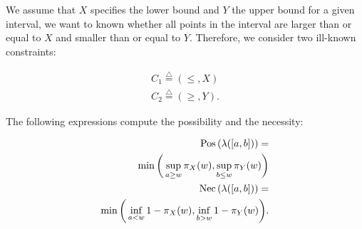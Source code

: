 We assume that $X$ specifies the lower bound and $Y$ the upper bound for a given interval, we want to known whether all points in the interval are larger than or equal to $X$ and smaller than or equal to $Y$. Therefore, we consider two ill-known constraints:

\begin{eqnarray}
C_1\stackrel{\triangle}{=}\left(\leq,X\right)\\
C_2\stackrel{\triangle}{=}\left(\geq,Y\right).
\end{eqnarray}

The following expressions compute the possibility and the necessity: 

\begin{eqnarray}
\label{eq:interval-pos}
\operatorname{Pos}\left(\lambda([a,b])\right)=\\
\nonumber
\min\bigg(\sup_{a\geq w}\pi_{X}(w),\sup_{b\leq w}\pi_{Y}(w)\bigg)\\
\label{eq:interval-nec}
\operatorname{Nec}\left(\lambda([a,b])\right)=\\
\nonumber
\min\bigg(\inf_{a<w}1-\pi_{X}(w),\inf_{b>w}1-\pi_{Y}(w)\bigg).
\end{eqnarray}

%



